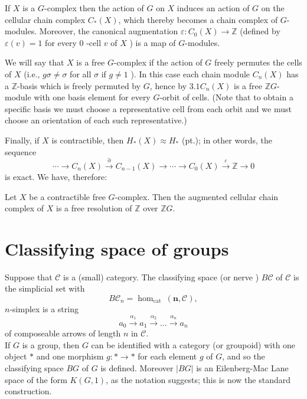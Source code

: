 If $X$ is a $G$-complex then the action of $G$ on $X$ induces an action of $G$ on the cellular chain complex $C_*(X)$, which thereby becomes a chain complex of $G$-modules. Moreover, the canonical augmentation $\varepsilon: C_0(X) \rightarrow \mathbb{Z}$ (defined by $\varepsilon(v)=1$ for every 0 -cell $v$ of $X$ ) is a map of $G$-modules.

We will say that $X$ is a free $G$-complex if the action of $G$ freely permutes the cells of $X$ (i.e., $g \sigma \neq \sigma$ for all $\sigma$ if $g \neq 1$ ). In this case each chain module $C_n(X)$ has a $\mathbb{Z}$-basis which is freely permuted by $G$, hence by $3.1 C_n(X)$ is a free $\mathbb{Z} G$-module with one basis element for every $G$-orbit of cells. (Note that to obtain a specific basis we must choose a representative cell from each orbit and we must choose an orientation of each such representative.)

Finally, if $X$ is contractible, then $H_*(X) \approx H_*$ (pt.); in other words, the sequence
$$
\cdots \rightarrow C_n(X) \stackrel{\partial}{\rightarrow} C_{n-1}(X) \rightarrow \cdots \rightarrow C_0(X) \stackrel{\varepsilon}{\rightarrow} \mathbb{Z} \rightarrow 0
$$
is exact. We have, therefore:

\begin{prop}
    
    Let $X$ be a contractible free $G$-complex. Then the augmented cellular chain complex of $X$ is a free resolution of $\mathbb{Z}$ over $\mathbb{Z} G$.
\end{prop}




\section{Classifying space of groups}

Suppose that $\mathcal{C}$ is a (small) category. The classifying space (or nerve ) $B \mathcal{C}$ of $\mathcal{C}$ is the simplicial set with
$$
B \mathcal{C}_n=\operatorname{hom}_{\text {cat }}(\mathbf{n}, \mathcal{C}),
$$
$n$-simplex is a string
$$
a_0 \xrightarrow{\alpha_1} a_1 \xrightarrow{\alpha_2} \ldots \xrightarrow{\alpha_n} a_n
$$
of composeable arrows of length $n$ in $\mathcal{C}$.\\

If $G$ is a group, then $G$ can be identified with a category (or groupoid) with one object $*$ and one morphism $g: * \rightarrow *$ for each element $g$ of $G$, and so the classifying space $B G$ of $G$ is defined. Moreover $|B G|$ is an Eilenberg-Mac Lane space of the form $K(G, 1)$, as the notation suggests; this is now the standard construction.


